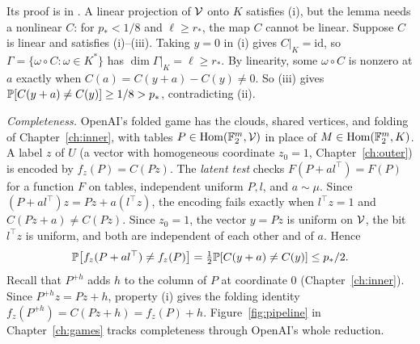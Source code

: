 Its proof is in \cite[Section~3]{OAI}. A linear projection of $\mathcal{V}$ onto $K$ satisfies (i), but the lemma needs a nonlinear $C$: for $p_*<1/8$ and $\ell\ge r_*$, the map $C$ cannot be linear. Suppose $C$ is linear and satisfies (i)--(iii). Taking $y=0$ in (i) gives $C|_K=\mathrm{id}$, so $\Gamma=\{\omega\circ C:\omega\in K^*\}$ has $\dim\Gamma|_K=\ell\ge r_*$. By linearity, some $\omega\circ C$ is nonzero at $a$ exactly when $C(a)=C(y+a)-C(y)\ne0$. So (iii) gives $\mathbb{P}[C(y+a)\ne C(y)]\ge1/8>p_*$, contradicting (ii).

\emph{Completeness.} OpenAI's folded game has the clouds, shared vertices, and folding of Chapter~\ref{ch:inner}, with tables $P\in\operatorname{Hom}(\mathbb{F}_2^m,\mathcal{V})$ in place of $M\in\operatorname{Hom}(\mathbb{F}_2^m,K)$. A label $z$ of $U$ (a vector with homogeneous coordinate $z_0=1$, Chapter~\ref{ch:outer}) is encoded by $f_z(P)=C(Pz)$. The \emph{latent test} checks $F(P+al^\top)=F(P)$ for a function $F$ on tables, independent uniform $P,l$, and $a\sim\mu$. Since $(P+al^\top)z=Pz+a(l^\top z)$, the encoding fails exactly when $l^\top z=1$ and $C(Pz+a)\ne C(Pz)$. Since $z_0=1$, the vector $y=Pz$ is uniform on $\mathcal{V}$, the bit $l^\top z$ is uniform, and both are independent of each other and of $a$. Hence
\[
\mathbb{P}\bigl[f_z(P+al^\top)\ne f_z(P)\bigr]=\tfrac12\mathbb{P}[C(y+a)\ne C(y)]\le p_*/2.
\]
Recall that $P^{+h}$ adds $h$ to the column of $P$ at coordinate $0$ (Chapter~\ref{ch:inner}). Since $P^{+h}z=Pz+h$, property (i) gives the folding identity $f_z(P^{+h})=C(Pz+h)=f_z(P)+h$. Figure~\ref{fig:pipeline} in Chapter~\ref{ch:games} tracks completeness through OpenAI's whole reduction.

